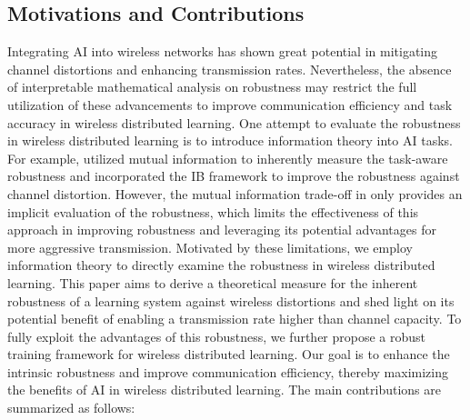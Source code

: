\documentclass[lettersize,journal]{IEEEtran}
\theoremstyle{definition}
\theoremstyle{plain}
\begin{document}
\subsection{Motivations and Contributions}
Integrating AI into wireless networks has shown great potential in mitigating channel distortions and enhancing transmission rates. Nevertheless, the absence of interpretable mathematical analysis on robustness may restrict the full utilization of these advancements to improve communication efficiency and task accuracy in wireless distributed learning.
One attempt to evaluate the robustness in wireless distributed learning is to introduce information theory into AI tasks. For example, \cite{IB} utilized mutual information to inherently measure the task-aware robustness and incorporated the IB framework to improve the robustness against channel distortion.
However, the mutual information trade-off in \cite{IB} only provides an implicit evaluation of the robustness, which limits the effectiveness of this approach in improving robustness and leveraging its potential advantages for more aggressive transmission.
Motivated by these limitations, we employ information theory to directly examine the robustness in wireless distributed learning. This paper aims to derive a theoretical measure for the inherent robustness of a learning system against wireless distortions and shed light on its potential benefit of enabling a transmission rate higher than channel capacity. 
To fully exploit the advantages of this robustness, we further propose a robust training framework for wireless distributed learning. Our goal is to enhance the intrinsic robustness and improve communication efficiency, thereby maximizing the benefits of AI in wireless distributed learning.
The main contributions are summarized as follows:
\end{document}
